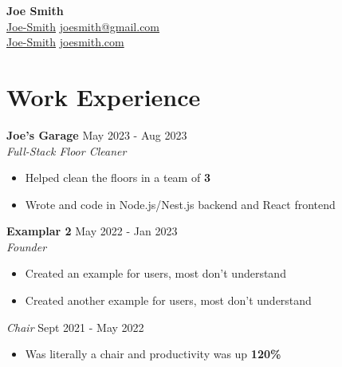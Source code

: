 \documentclass[letterpaper, 10pt]{article}
\newcommand{\iconSpace}{\hspace{2px}}
\newcommand{\bulletSpace}{\vspace{-4pt}}
\newcommand{\hSpace}{\hspace{8px}}
\newcommand{\secStartSpace}{\vspace{3pt}}
\newcommand{\secEndSpace}{\vspace{5pt}}
\newcommand{\spaceCollapse}{\vspace{-2pt}}
\newcommand{\workHeader}[3]{
\noindent \large{\textbf{\textcolor{TextColor}{#1}}} \hfill \normalsize{#3}\vspace{2pt}\\
	\textit{#2}\vspace{-2pt}
}
\newcommand{\workSubHeader}[2]{
    \noindent \textit{#1} \hfill \normalsize{#2}
	\vspace{-2pt}
}
\newcommand{\boldlarger}[1]{{\large\textbf{\color{white}{#1}}}}
\newcommand{\justlarge}[1]{{\large \textbf{#1}}}
\begin{document}
\begin{center} 
	{\Huge \textbf{Joe Smith}}\\
	\vspace{1px}
 \color{TextColor}
	{
		\color{white}
             \iconSpace \href{https://www.linkedin.com/in/Joe-Smith/}{Joe-Smith}
		\hfill
		\href{mailto:joesmith@gmail.com}{joesmith@gmail.com} \vspace{2pt} \iconSpace {} 
        }\\
	{
            \color{white}
		 \iconSpace \href{https://github.com/Joe-Smith}{Joe-Smith}
            \hfill
		\href{https://joesmith.com/}{joesmith.com} \iconSpace {} 
	}
\end{center}
\spaceCollapse
\spaceCollapse


\section{\color{blue} \textbf{Work Experience}}
\secStartSpace

\begin{addmargin}[0.5em]{1em}
	\workHeader{Joe's Garage}{Full-Stack Floor Cleaner}{May 2023 - Aug 2023}
	\begin{itemize}
		\item Helped clean the floors in a team of \justlarge{3}
		      \bulletSpace
            \item Wrote \boldlarger{testable} and \boldlarger{well documented} code in Node.js/Nest.js backend and React frontend
	\end{itemize}
		
	\workHeader{Examplar 2}{Founder}{May 2022 - Jan 2023}
	\begin{itemize}
		\item Created an example for users, most don't understand
		      \bulletSpace
		\item Created another example for users, most don't understand
	\end{itemize}
	\workSubHeader{Chair}{Sept 2021 - May 2022}
	\begin{itemize}
		\item Was literally a chair and productivity was up \justlarge{120\%}
	\end{itemize}
\end{addmargin}
\secEndSpace
\end{document}
